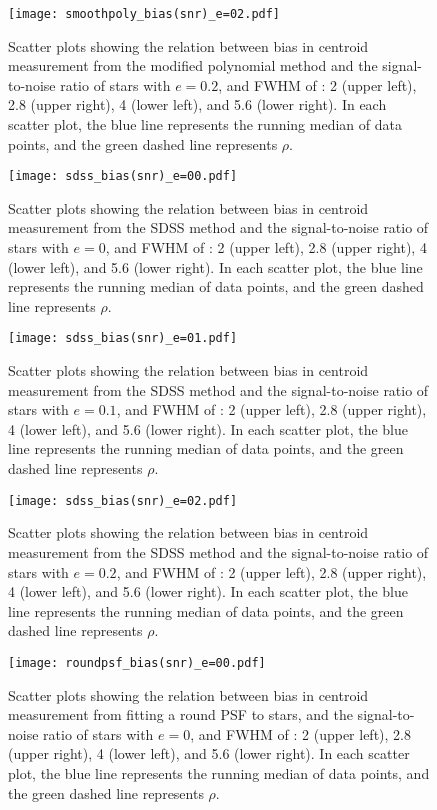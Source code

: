 \documentclass[12pt, preprint]{aastex}
\begin{document}
\begin{figure}[!htb]
  \texttt{[image: smoothpoly\_bias(snr)\_e=02.pdf]}
\endminipage
\caption{Scatter plots showing the relation between bias in centroid measurement from the modified polynomial method and the signal-to-noise ratio of stars with $e=0.2$, and FWHM of : 2 (upper left), 2.8 (upper right), 4 (lower left), and 5.6 (lower right). In each scatter plot, the blue line represents the running median of data points, and the green dashed line represents $\rho$.}\label{6}
\end{figure}


\begin{figure}[!htb]
  \texttt{[image: sdss\_bias(snr)\_e=00.pdf]}
\endminipage
\caption{Scatter plots showing the relation between bias in centroid measurement from the SDSS method and the signal-to-noise ratio of stars with $e=0$, and FWHM of : 2 (upper left), 2.8 (upper right), 4 (lower left), and 5.6 (lower right). In each scatter plot, the blue line represents the running median of data points, and the green dashed line represents $\rho$.}\label{7}
\end{figure}

\begin{figure}[!htb]
  \texttt{[image: sdss\_bias(snr)\_e=01.pdf]}
\endminipage
\caption{Scatter plots showing the relation between bias in centroid measurement from the SDSS method and the signal-to-noise ratio of stars with $e=0.1$, and FWHM of : 2 (upper left), 2.8 (upper right), 4 (lower left), and 5.6 (lower right). In each scatter plot, the blue line represents the running median of data points, and the green dashed line represents $\rho$.}\label{8}
\end{figure}

\begin{figure}[!htb]
  \texttt{[image: sdss\_bias(snr)\_e=02.pdf]}
\endminipage
\caption{Scatter plots showing the relation between bias in centroid measurement from the SDSS method and the signal-to-noise ratio of stars with $e=0.2$, and FWHM of : 2 (upper left), 2.8 (upper right), 4 (lower left), and 5.6 (lower right). In each scatter plot, the blue line represents the running median of data points, and the green dashed line represents $\rho$.}\label{9}
\end{figure}

\begin{figure}[!htb]
  \texttt{[image: roundpsf\_bias(snr)\_e=00.pdf]}
\endminipage
\caption{Scatter plots showing the relation between bias in centroid measurement from fitting a round PSF to stars, and the signal-to-noise ratio of stars with $e=0$, and FWHM of : 2 (upper left), 2.8 (upper right), 4 (lower left), and 5.6 (lower right). In each scatter plot, the blue line represents the running median of data points, and the green dashed line represents $\rho$.}\label{10}
\end{figure}
\end{document}
